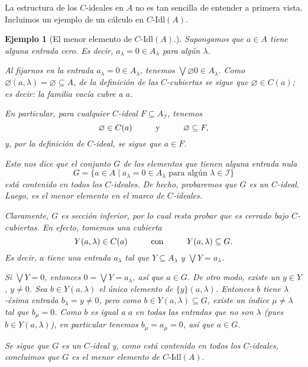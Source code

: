 \documentclass[12pt,letterpaper,titlepage]{article}
\let\emptyset\varnothing
\newtheorem*{exa}{Ejemplo}
\theoremstyle{definition}
\newcommand\Sup{\bigvee}
\newcommand\scr[1]{\mathscr{#1}}
\newcommand\<{\langle}
\renewcommand\>{\rangle}
\newcommand\Idl{\text{-}\mathrm{Idl}}
\begin{document}
La estructura de los $C$-ideales en $A$ no es tan sencilla
de entender a primera vista.
Incluimos un ejemplo de un cálculo en $C\Idl(A)$.

\begin{exa}[El menor elemento de $C\Idl(A)$.]
    Supongamos que $a\in A$ tiene
    alguna entrada cero.
    Es decir, $a_\lambda=0\in A_\lambda$ para algún $\lambda$.
    
    Al fijarnos en la entrada $a_\lambda=0\in A_\lambda$,
    tenemos $\Sup\emptyset 0\in A_\lambda$.
    Como $\emptyset(a,\lambda)=\emptyset\subseteq A$,
    de la definición de las $C$-cubiertas
    se sigue que $\emptyset\in C(a)$;
    es decir: la familia vacía cubre a $a$.
    
    En particular, para cualquier $C$-ideal $F\subseteq A_\scr I$,
    tenemos
    \[
        \emptyset \in C(a)
        \hspace{10mm} \text{y} \hspace{10mm}
        \emptyset\subseteq F
    ,\]
    y, por la definición de $C$-ideal, se sigue que $a\in F$.
    
    Esto nos dice que el conjunto $G$ de los elementos que tienen
    alguna entrada nula
    \[
        G=\{a\in A \mid a_\lambda = 0\in A_\lambda
        \text{ para algún } \lambda\in \scr I\}
    \]
    está contenido en todos los $C$-ideales.
    De hecho, probaremos que $G$ es un $C$-ideal.
    Luego, es el menor elemento en el marco de $C$-ideales.

    Claramente, $G$ es sección inferior, por lo cual resta
    probar que es cerrado bajo $C$-cubiertas.
    En efecto, tomemos una cubierta
    \[
        Y(a,\lambda) \in C(a)
        \hspace{10mm} \text{con} \hspace{10mm}
        Y(a,\lambda) \subseteq G
    .\]
    Es decir, $a$ tiene una entrada $a_\lambda$ tal que
    $Y\subseteq A_\lambda$ y $\Sup Y=a_\lambda$.
    
    Si $\Sup Y=0$, entonces $0=\Sup Y=a_\lambda$, así que $a\in G$.
    De otro modo, existe un $y\in Y$, $y\neq 0$.
    Sea $b\in Y(a,\lambda)$ el único elemento de
    $\{y\}(a,\lambda)$.
    Entonces $b$ tiene $\lambda$-ésima entrada
    $b_\lambda=y\neq 0$, pero como $b\in Y(a,\lambda)\subseteq G$,
    existe un índice $\mu\neq\lambda$ tal que $b_\mu = 0$.
    Como $b$ es igual a $a$ en todas las entradas
    que no son $\lambda$ (pues $b\in Y(a,\lambda)$),
    en particular tenemos $b_\mu=a_\mu=0$, así que $a\in G$.
    
    Se sigue que $G$ es un $C$-ideal y, como está contenido
    en todos los $C$-ideales, concluimos que $G$ es el
    menor elemento de $C\Idl(A)$.
\end{exa}
\end{document}
